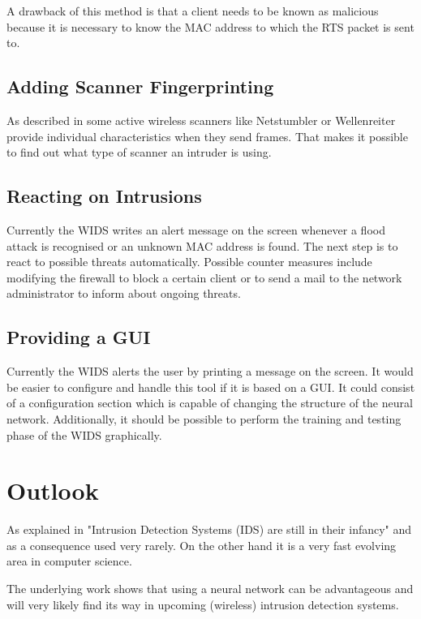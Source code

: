 A drawback of this method is that a client needs to be known as malicious because it is necessary to know the MAC address to which the RTS packet is sent to.

\subsection{Adding Scanner Fingerprinting}

As described in \cite{wlan_fingerprints} some active wireless scanners like Netstumbler or Wellenreiter provide individual characteristics when they send frames. That makes it possible to find out what type of scanner an intruder is using.

\subsection{Reacting on Intrusions}

Currently the WIDS writes an alert message on the screen whenever a flood attack is recognised or an unknown MAC address is found. The next step is to react to possible threats automatically. Possible counter measures include modifying the firewall to block a certain client or to send a mail to the network administrator to inform about ongoing threats.

\subsection{Providing a GUI}

Currently the WIDS alerts the user by printing a message on the screen. It would be easier to configure and handle this tool if it is based on a GUI. It could consist of a configuration section which is capable of changing the structure of the neural network. Additionally, it should be possible to perform the training and testing phase of the WIDS graphically.

\section{Outlook}

As explained in \cite{IDS_terminology} "Intrusion Detection Systems (IDS) are still in their infancy" and as a consequence used very rarely. On the other hand it is a very fast evolving area in computer science.

The underlying work shows that using a neural network can be advantageous and will very likely find its way in upcoming (wireless) intrusion detection systems.
